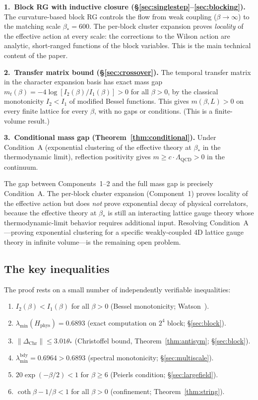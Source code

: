 \documentclass[11pt]{article}
\theoremstyle{definition}
\newcommand{\Lam}{\Lambda_{\mathrm{QCD}}}
\begin{document}
\medskip\noindent\textbf{1.~Block RG with inductive closure
(\S\ref{sec:singlestep}--\ref{sec:blocking}).}
The curvature-based block RG controls the flow from weak coupling
($\beta\to\infty$) to the matching scale $\beta_*=600$.  The
per-block cluster expansion proves \emph{locality} of the effective
action at every scale: the corrections to the Wilson action are
analytic, short-ranged functions of the block variables.
This is the main technical content of the paper.

\medskip\noindent\textbf{2.~Transfer matrix bound
(\S\ref{sec:crossover}).}
The temporal transfer matrix in the character expansion basis has
exact mass gap $m_t(\beta)=-4\log[I_2(\beta)/I_1(\beta)]>0$ for all
$\beta>0$, by the classical monotonicity $I_2<I_1$ of modified
Bessel functions.  This gives $m(\beta,L)>0$ on every finite
lattice for every $\beta$, with no gaps or conditions.
(This is a finite-volume result.)

\medskip\noindent\textbf{3.~Conditional mass gap
(Theorem~\ref{thm:conditional}).}
Under Condition~A (exponential clustering of the effective
theory at $\beta_*$ in the thermodynamic limit), reflection
positivity gives $m\ge c\cdot\Lam>0$ in the continuum.

\medskip
The gap between Components~1--2 and the full mass gap is precisely
Condition~A.  The per-block cluster expansion (Component~1) proves
locality of the effective action but does \emph{not} prove
exponential decay of physical correlators, because the effective
theory at $\beta_*$ is still an interacting lattice gauge theory
whose thermodynamic-limit behavior requires additional input.
Resolving Condition~A---proving exponential clustering for a
specific weakly-coupled 4D lattice gauge theory in infinite
volume---is the remaining open problem.

\subsection{The key inequalities}

The proof rests on a small number of independently verifiable
inequalities:

\begin{enumerate}
\item $I_2(\beta)<I_1(\beta)$ for all $\beta>0$
(Bessel monotonicity; Watson~\cite{Watson44}).
\item $\lambda_{\min}(H_{\mathrm{phys}})=0.6893$
(exact computation on $2^4$ block; \S\ref{sec:block}).
\item $\|\Delta_{\mathrm{Chr}}\|\le 3.01\theta_*$ (Christoffel bound, Theorem~\ref{thm:antisym};
\S\ref{sec:block}).
\item $\lambda_{\min}^{\mathrm{bdy}}=0.6964>0.6893$ (spectral
monotonicity; \S\ref{sec:multiscale}).
\item $20\exp(-\beta/2)<1$ for $\beta\ge 6$ (Peierls condition;
\S\ref{sec:largefield}).
\item $\coth\beta-1/\beta<1$ for all $\beta>0$
(confinement; Theorem~\ref{thm:string}).
\end{enumerate}
\end{document}
